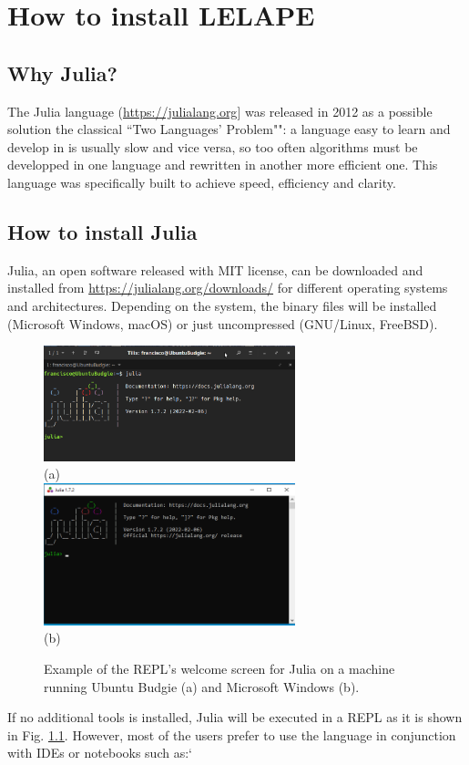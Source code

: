 \chapter{How to install LELAPE}
\section{Why Julia?}
The Julia language (\href{https://julialang.org}{https://julialang.org}] was released in 2012 as a possible solution the classical ``Two Languages' Problem"": a language easy to learn and develop in is usually slow and vice versa, so too often algorithms must be developped in one language and rewritten in another more efficient one. This language was specifically built to achieve speed, efficiency and clarity.

\section{How to install Julia}
%
Julia, an open software released with MIT license, can be downloaded and installed from \href{https://julialang.org/downloads/}{https://julialang.org/downloads/} for different operating systems and architectures. Depending on the system, the binary files will be installed (Microsoft Windows, macOS) or just uncompressed (GNU/Linux, FreeBSD). 

\begin{figure}
	\centering
	\includegraphics[width=0.65\textwidth]{fig/Julia_REPL} 
	\\(a)\\
	\vspace{1cm}
	\includegraphics[width=0.65\textwidth]{fig/julia_in_windows}
	\\(b)\\
	\caption{Example of the REPL's welcome screen for Julia on a machine running Ubuntu Budgie (a) and Microsoft Windows (b).}
	\label{Fig;JuliaREPL}
\end{figure}
%
If no additional tools is installed, Julia will be executed in a REPL as it is shown in Fig. \ref{Fig;JuliaREPL}. However, most of the users prefer to use the language in conjunction with IDEs or notebooks such as:`

